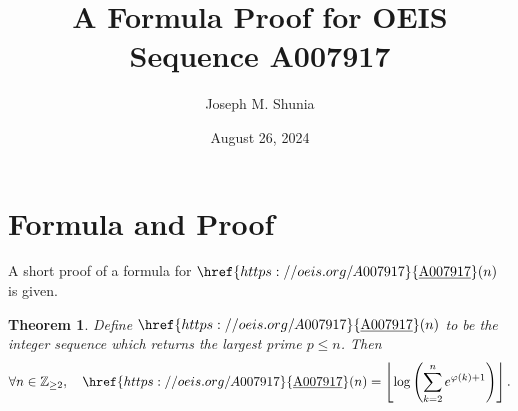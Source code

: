 \documentclass[10pt,a4paper]{article}
\title{A Formula Proof for OEIS Sequence A007917}
\author{Joseph M. Shunia}
\date{August 26, 2024}
\theoremstyle{plain}
\newtheorem{theorem}{Theorem}[section]
\newcommand{\floor}[1]{\left\lfloor #1 \right\rfloor}
\newcommand{\Z}{\mathbb{Z}}
\newcommand{\seqnum}[1]{\href{https://oeis.org/#1}{\rm \underline{#1}}}
\begin{document}
\maketitle

\section{Formula and Proof}
A short proof of a formula for $\seqnum{A007917}(n)$ is given.

\begin{theorem}
Define $\seqnum{A007917}(n)$ to be the integer sequence which returns the largest prime $p \leq n$. Then 
\begin{align*}
\forall n \in \Z_{\geq 2}, \quad 
\seqnum{A007917}(n) = \floor{ \log\left( \sum_{k=2}^n e^{\varphi(k)+1} \right) }.
\end{align*}
\end{theorem}
\end{document}
